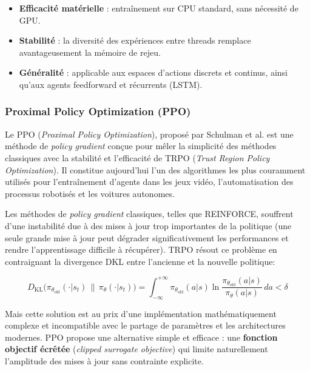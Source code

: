 \begin{itemize}[noitemsep, topsep=4pt]
    \item \textbf{Efficacité matérielle} : entraînement sur CPU standard, 
    sans nécessité de GPU.
    \item \textbf{Stabilité} : la diversité des expériences entre threads 
    remplace avantageusement la mémoire de rejeu.
    \item \textbf{Généralité} : applicable aux espaces d'actions discrets et 
    continus, ainsi qu'aux agents feedforward et récurrents (LSTM).
\end{itemize}

\subsubsection{Proximal Policy Optimization (PPO)}



Le PPO (\textit{Proximal Policy Optimization}), proposé par Schulman et al. \cite{ref4} est une méthode de \textit{policy gradient} conçue 
pour mêler la simplicité  des méthodes classiques avec la stabilité et l'efficacité de TRPO (\textit{Trust Region Policy Optimization}). Il constitue aujourd'hui l'un des algorithmes les plus couramment utilisés pour l'entraînement d'agents dans les jeux vidéo, l'automatisation des processus robotisés et les voitures autonomes.

\vspace{0.5cm}

Les méthodes de \textit{policy gradient} classiques, telles que REINFORCE, souffrent d'une instabilité due à des mises à jour trop importantes de la politique (une seule grande mise à jour peut dégrader significativement les performances et rendre l'apprentissage difficile à récupérer). TRPO résout ce problème en contraignant la divergence DKL entre l'ancienne et la nouvelle politique: 

\begin{equation}
    D_{\text{KL}}\big(\pi_{\theta_{\text{old}}}(\cdot | s_t) \,\|\, 
    \pi_\theta(\cdot | s_t)\big) = \int_{-\infty}^{+\infty} 
    \pi_{\theta_{\text{old}}}(a|s) \ln 
    \frac{\pi_{\theta_{\text{old}}}(a|s)}{\pi_\theta(a|s)} \, da < \delta
    \label{eq:kl_trpo}
\end{equation}

Mais cette solution est au prix d'une implémentation mathématiquement complexe et incompatible avec le partage de paramètres et les architectures modernes. PPO propose une alternative simple et efficace : une \textbf{fonction objectif écrêtée} (\textit{clipped surrogate objective}) qui limite naturellement l'amplitude des mises à jour sans contrainte explicite.

